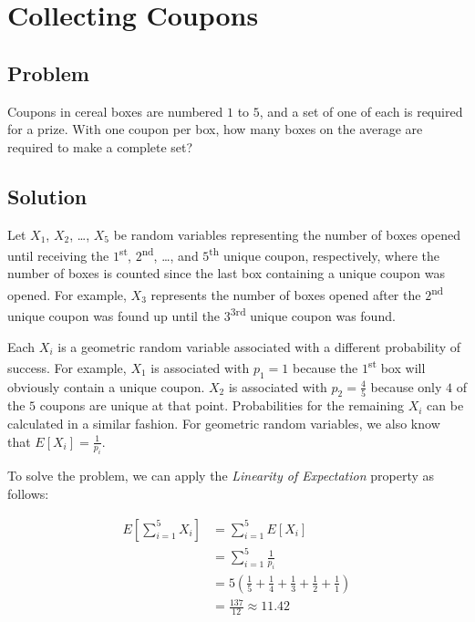 \documentclass{article}
\date{}
\author{Kaan Aksoy | Feb 24, 2020}
\begin{document}
\maketitle
\section{Collecting Coupons}
\subsection{Problem}

Coupons in cereal boxes are numbered $1$ to $5$, 
and a set of one of each is required for a prize. 
With one coupon per box, how many boxes on the 
average are required to make a complete set?

\subsection{Solution}

Let $X_{1}$, $X_{2}$, \ldots, $X_{5}$ be random 
variables representing the number of boxes opened 
until receiving the $1$\textsuperscript{st},
$2$\textsuperscript{nd}, \ldots, 
and $5$\textsuperscript{th} unique coupon, respectively, 
where the number of boxes is counted since the last 
box containing a unique coupon was opened. For example, $X_{3}$ 
represents the number of boxes opened after the 
$2$\textsuperscript{nd} unique coupon was found up 
until the $3$\textsuperscript{3rd} unique coupon was found.

Each $X_{i}$ is a 
geometric random variable associated with a 
different probability of success. For example, $X_{1}$ 
is associated with $p_{1} = 1$ because the 
$1$\textsuperscript{st} box will obviously contain
a unique coupon. $X_{2}$ is 
associated with $p_{2} = \frac{4}{5}$ because only $4$
of the $5$ coupons are unique at that point. 
Probabilities for the remaining $X_{i}$ can be 
calculated in a similar fashion. For geometric 
random variables, we also know that 
$E[X_{i}] = \frac{1}{p_{i}}$.

To solve the problem, we can apply the 
\textit{Linearity of Expectation} property as 
follows:

\begin{equation*}
\begin{split}
E \left[\sum_{i=1}^5 X_{i} \right] &= \sum_{i=1}^5 E[X_{i}] \\
&= \sum_{i=1}^5 \frac{1}{p_{i}} \\
&= 5 \left( \frac{1}{5} + \frac{1}{4} + 
\frac{1}{3} + \frac{1}{2} + \frac{1}{1} \right) \\
&= \frac{137}{12} \approx 11.42
\end{split}
\end{equation*}
\end{document}
